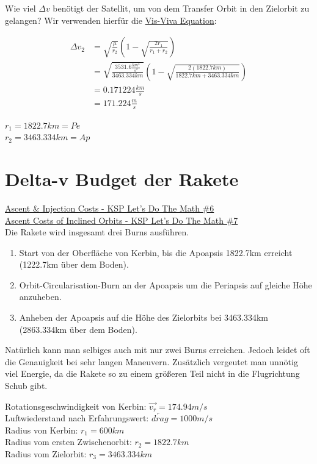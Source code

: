 \documentclass[12pt,paper=A4,numbers=noenddot,bibliography=totoc,listof=totoc,DIV=11,BCOR=1mm]{scrreprt}
\newcommand{\gq}[1]{\glqq #1\grqq} %
\begin{document}
Wie viel $\Delta v$ benötigt der Satellit, um von dem Transfer Orbit in den Zielorbit zu gelangen?
Wir verwenden hierfür die \hyperlink{visviva}{Vis-Viva Equation}:

\begin{equation*}
\begin{split}
\Delta v_{2} &= \sqrt{\frac{\mu}{r_{2}}} \left( 1-\sqrt{\frac{2r_{1}}{r_{1}+r_{2}}} \right) \\
             &= \sqrt{\frac{3531.6 \frac{km^{3}}{s^{2}}}{3463.334km}} \left( 1-\sqrt{\frac{2(1822.7km)}{1822.7km+3463.334km}} \right) \\
             &= 0.171224\frac{km}{s} \\
             &= 171.224\frac{m}{s}
\end{split}
\end{equation*}
\begin{flushright}
$r_{1} = 1822.7km = Pe$ \\
$r_{2} = 3463.334km = Ap$
\end{flushright}

\section{Delta-v Budget der Rakete}
\href{https://youtu.be/aSH07ngBbIY}{Ascent \& Injection Costs - KSP Let's Do The Math \#6}\\
\href{https://youtu.be/0BtbYVtZ9ac}{Ascent Costs of Inclined Orbits - KSP Let's Do The Math \#7}\\

Die Rakete wird insgesamt drei Burns ausführen.
\begin{enumerate}
\item Start von der Oberfläche von Kerbin, bis die Apoapsis 1822.7km erreicht (1222.7km über dem Boden).
\item Orbit-Circularisation-Burn an der Apoapsis um die Periapsis auf gleiche Höhe anzuheben.
\item Anheben der Apoapsis auf die Höhe des Zielorbits bei 3463.334km (2863.334km über dem Boden).
\end{enumerate}
Natürlich kann man selbiges auch mit nur zwei Burns erreichen. Jedoch leidet oft die Genauigkeit bei sehr langen Maneuvern. Zusätzlich vergeutet man unnötig viel Energie, da die Rakete so zu einem größeren Teil nicht in die \gq{Flugrichtung} Schub gibt.

\begin{flushleft}
Rotationsgeschwindigkeit von Kerbin: $\overrightarrow{v_{r}} = 174.94 m/s$ \\
Luftwiederstand nach Erfahrungswert: $\overleftarrow{drag} = 1000 m/s$ \\
Radius von Kerbin: $r_{1} = 600km$ \\
Radius vom ersten Zwischenorbit: $r_{2} = 1822.7km$ \\
Radius vom Zielorbit: $r_{3} = 3463.334km$
\end{flushleft}
\end{document}
